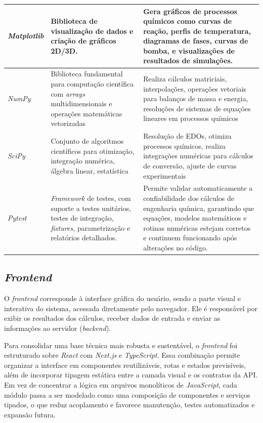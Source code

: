 \begin{longtable}{|>{\raggedright\arraybackslash}p{}|>{\raggedright\arraybackslash}p{}|>{\raggedright\arraybackslash}p{}|}
\textit{Matplotlib} & Biblioteca de visualização de dados e criação de gráficos 2D/3D. & Gera gráficos de processos químicos como curvas de reação, perfis de temperatura, diagramas de fases, curvas de bomba, e visualizações de resultados de simulações. \\ \hline
\textit{NumPy} & Biblioteca fundamental para computação científica com \textit{arrays} multidimensionais e operações matemáticas vetorizadas & Realiza cálculos matriciais, interpolações, operações vetoriais para balanços de massa e energia, resoluções de sistemas de equações lineares em processos químicos \\ \hline
\textit{SciPy} & Conjunto de algoritmos científicos para otimização, integração numérica, álgebra linear, estatística & Resolução de EDOs, otimiza processos químicos, realiza integrações numéricas para cálculos de conversão, ajuste de curvas experimentais \\ \hline
\textit{Pytest} & \textit{Framework} de testes, com suporte a testes unitários, testes de integração, \textit{fixtures}, parametrização e relatórios detalhados. & Permite validar automaticamente a confiabilidade dos cálculos de engenharia química, garantindo que equações, modelos matemáticos e rotinas numéricas estejam corretos e continuem funcionando após alterações no código. \\ \hline
\end{longtable}

\subsection{\textit{Frontend}}

O \textit{frontend} corresponde à interface gráfica do usuário, sendo a parte visual e interativa do sistema, acessada diretamente pelo navegador. Ele é responsável por exibir os resultados dos cálculos, receber dados de entrada e enviar as informações ao servidor (\textit{backend}).

Para consolidar uma base técnica mais robusta e sustentável, o \textit{frontend} foi estruturado sobre \textit{React} com \textit{Next.js} e \textit{TypeScript}. Essa combinação permite organizar a interface em componentes reutilizáveis, rotas e estados previsíveis, além de incorporar tipagem estática entre a camada visual e os contratos da API. Em vez de concentrar a lógica em arquivos monolíticos de \textit{JavaScript}, cada módulo passa a ser modelado como uma composição de componentes e serviços tipados, o que reduz acoplamento e favorece manutenção, testes automatizados e expansão futura.


